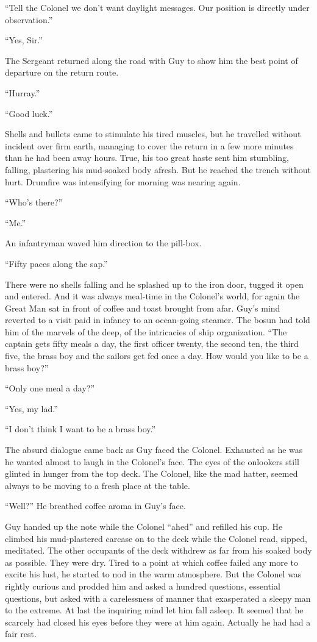 ``Tell the Colonel we don't want daylight messages. Our position is directly under observation.''

``Yes, Sir.''

The Sergeant returned along the road with Guy to show him the best point of departure on the return route.

``Hurray.''

``Good luck.''

Shells and bullets came to stimulate his tired muscles, but he travelled without incident over firm earth, managing to cover the return in a few more minutes than he had been away hours. True, his too great haste sent him stumbling, falling, plastering his mud-soaked body afresh. But he reached the trench without hurt. Drumfire was intensifying for morning was nearing again.

``Who's there?''

``Me.''

An infantryman waved him direction to the pill-box.

``Fifty paces along the sap.''

There were no shells falling and he splashed up to the iron door, tugged it open and entered. And it was always meal-time in the Colonel's world, for again the Great Man sat in front of coffee and toast brought from afar. Guy's mind reverted to a visit paid in infancy to an ocean-going steamer. The bosun had told him of the marvels of the deep, of the intricacies of ship organization. ``The captain gets fifty meals a day, the first officer twenty, the second ten, the third five, the brass boy and the sailors get fed once a day. How would you like to be a brass boy?''

``Only one meal a day?''

``Yes, my lad.''

``I don't think I want to be a brass boy.''

The absurd dialogue came back as Guy faced the Colonel. Exhausted as he was he wanted almost to laugh in the Colonel's face. The eyes of the onlookers still glinted in hunger from the top deck. The Colonel, like the mad hatter, seemed always to be moving to a fresh place at the table.

``Well?'' He breathed coffee aroma in Guy's face.

Guy handed up the note while the Colonel ``ahed'' and refilled his cup. He climbed his mud-plastered carcase on to the deck while the Colonel read, sipped, meditated. The other occupants of the deck withdrew as far from his soaked body as possible. They were dry. Tired to a point at which coffee failed any more to excite his lust, he started to nod in the warm atmosphere. But the Colonel was rightly curious and prodded him and asked a hundred questions, essential questions, but asked with a carelessness of manner that exasperated a sleepy man to the extreme. At last the inquiring mind let him fall asleep. It seemed that he scarcely had closed his eyes before they were at him again. Actually he had had a fair rest.


